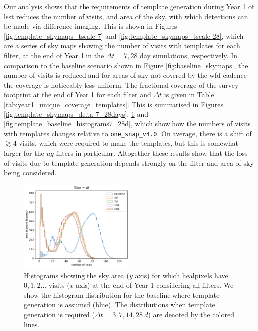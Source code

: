 \documentclass[preprintm,linenumbers]{aastex631}
\newcommand{\baseline}{\texttt{one\_snap\_v4.0}\xspace}
\begin{document}
		Our analysis shows that the requirements of template generation during Year 1 of \gls*{lsst} reduces the number of visits, and area of the sky, with which detections can be made via difference imaging.
This is shown in Figures \ref{fig:template_skymaps_tscale-7} and  \ref{fig:template_skymaps_tscale-28}, which are a series of sky maps showing the number of visits with templates for each filter, at the end of Year 1 in the $\Delta t = 7, 28$ day simulations, respectively.
In comparison to the baseline scenario shown in Figure \ref{fig:baseline_skymaps}, the number of visits is reduced and for areas of sky not covered by the \gls*{wfd} cadence the coverage is noticeably less uniform.
The fractional coverage of the survey footprint at the end of Year 1 for each filter and $\Delta t$ is given in Table \ref{tab:year1_unique_coverage_templates}.
This is summarised in Figures 
\ref{fig:template_skymaps_delta-7_28days}, \ref{fig:template_baseline_all} and \ref{fig:template_baseline_histograms7_28d}, which show how the numbers of visits with templates changes relative to \baseline.
On average, there is a shift of $\gtrsim4$ visits, which were required to make the templates, but this is somewhat larger for the $ug$ filters in particular.
Altogether these results show that the loss of visits due to template generation depends strongly on the filter and area of sky being considered.

		\begin{figure}
			\centering
			
			\includegraphics[width=0.5\textwidth]{results/histograms/hist_first_year_one_snap_v4_0_10yrs_db_noDD_noTwi_CountMetric_doAllTemplateMetrics_reduceCount_all_noDD_noTwi.pdf}
			
			\caption{
				Histograms showing the sky area ($y$ axis) for which healpixels have $0, 1, 2...$ visits ($x$ axis) at the end of Year 1 considering all filters.
				We show the histogram distribution for the baseline where template generation is assumed (blue).
				The distributions when template generation is required ($\Delta t = 3, 7, 14, 28\ \si{d}$) are denoted by the colored lines.
			\label{fig:template_baseline_all}}
		\end{figure}
		
\end{document}
